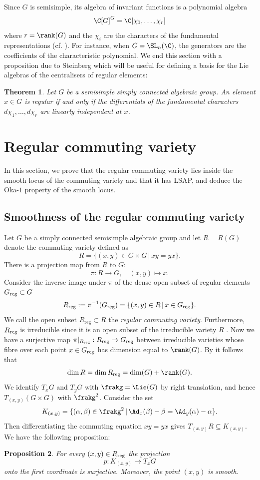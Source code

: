 \documentclass[12pt, a4paper, oneside]{amsart}
\theoremstyle{plain} %
\newtheorem{theorem}{Theorem}
\newtheorem{proposition}[theorem]{Proposition}
\theoremstyle{definition} %
\theoremstyle{remark} %
\begin{document}
Since $G$ is semisimple, its algebra of invariant functions is a polynomial algebra
\[\C[G]^G = \C[\chi_1,\dots, \chi_r]\]
where $r = \rank(G)$ and the $\chi_i$ are the characters of the fundamental representations (cf. \cite{Ste65}). For instance, when $G=\SL_n(\C)$, the generators are the coefficients of the characteristic polynomial. We end this section with a proposition due to Steinberg which will be useful for defining a basis for the Lie algebras of the centralisers of regular elements:
\begin{theorem}{\cite[Theorem 8.1]{Ste65}}\label{thm:Steinberg}
Let $G$ be a semisimple simply connected algebraic group. An element $x\in G$ is regular if and only if the differentials of the fundamental characters $d\chi_1,\dots,d\chi_r$ are linearly independent at $x$.
\end{theorem}

\section{Regular commuting variety}\label{c:regularcommutingvariety}
In this section, we prove that the regular commuting variety lies inside the smooth locus of the commuting variety and that it has LSAP, and deduce the Oka-$1$ property of the smooth locus.
\subsection{Smoothness of the regular commuting variety}\label{c:Smoothness}

Let $G$ be a simply connected semisimple algebraic group and let $R=R(G)$ denote the commuting variety defined as
\[R = \{(x,y)\in G\times G\,|\, xy=yx\}.\]
There is a projection map from $R$ to $G$: 
\[\pi:R\longrightarrow G,\quad (x,y)\longmapsto x.\]
 Consider the inverse image under $\pi$ of the dense open subset of regular elements $G_{\rm reg}\subset G$
 \[R_{\mathrm{reg}} := \pi^{-1}(G_{\rm reg}) =  \{(x,y)\in R\,|\, x\in G_{\mathrm{reg}}\}.\]
We call the open subset $R_{\mathrm{reg}}\subset R$ the \emph{regular commuting variety}. Furthermore, $R_{\rm reg}$ is irreducible since it is an open subset of the irreducible variety $R$ \cite{Ric79}. Now we have a surjective map $\pi|_{R_{\rm reg}}:R_{\rm reg}\to G_{\rm reg}$ between irreducible varieties whose fibre over each point $x\in G_{\rm reg}$ has dimension equal to $\rank(G)$. By \cite[\S 6.3, Theorem 1.25]{Sha13} it follows that 
\[\dim R = \dim R_{\rm reg}=\dim(G)+\rank(G).\]
We identify $T_xG$ and $T_yG$ with $\frakg=\Lie(G)$ by right translation, and hence $T_{(x,y)}(G\times G)$ with $\frakg^2$.
Consider the set
\[K_{(x,y)}= \{(\alpha,\beta)\in \frakg^2\,|\, \Ad_x(\beta)-\beta=\Ad_y(\alpha)-\alpha\}.\]
Then differentiating the commuting equation $xy=yx$ gives $T_{(x,y)}R\subseteq K_{(x,y)}$.
We have the following proposition:
 \begin{proposition}\label{prop:submersion}
For every $(x,y)\in R_{\rm reg}$ the projection  
 \[p:K_{(x,y)} \longrightarrow T_xG\]
 onto the first coordinate is surjective. Moreover, the point $(x,y)$ is smooth.
 \end{proposition}
 
\end{document}
